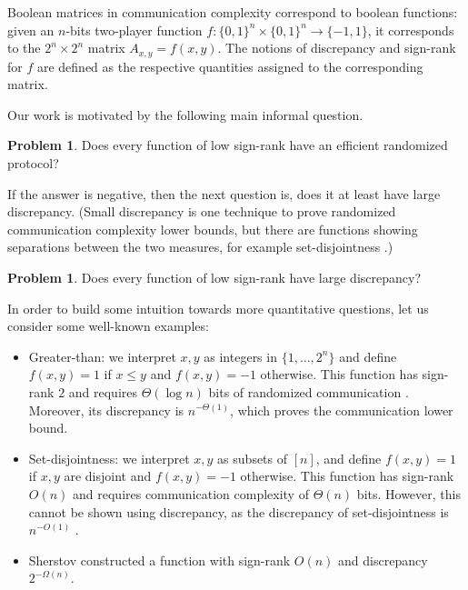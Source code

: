 \documentclass[11pt]{article}
\numberwithin{equation}{section}
\theoremstyle{definition}
\theoremstyle{plain}
\theoremstyle{definition}\newtheorem{problem}[theorem]{Problem}\theoremstyle{plain}
\begin{document}
Boolean matrices in communication complexity correspond to boolean functions:
given an $n$-bits %
two-player  %
function $f:\{0,1\}^n \times \{0,1\}^n \to \{-1,1\}$, it corresponds to the $2^n \times 2^n$ matrix $A_{x,y}=f(x,y)$. The notions of discrepancy and sign-rank
for $f$ %
%
are defined as the respective quantities assigned to the
corresponding matrix.

%
%
Our work is motivated by the following main informal question.  %
\begin{problem}
Does every function of low sign-rank have an efficient randomized protocol?
\end{problem}

If the answer is negative, then the next question is, does it at least have 
large %
discrepancy.  (Small   %
discrepancy is one technique to prove randomized communication complexity lower bounds, but there are functions showing separations between the two measures,
for example set-disjointness \cite{chattopadhyay2010story}.)  %


\begin{problem}
Does every function of low sign-rank have large discrepancy?
\end{problem}

In order to build some intuition towards more quantitative questions, 
let us consider some well-known examples:


\begin{itemize}
\item Greater-than: we interpret $x,y$ as integers in $\{1,\ldots,2^n\}$ and define $f(x,y) = 1$ if $x \le y$ and $f(x,y)=-1$ otherwise. This function has sign-rank $2$ and requires $\Theta(\log n)$ bits of randomized communication \cite{nisan1993communication}. Moreover, its discrepancy is $n^{-\Theta(1)}$, which proves the communication lower bound.

\item Set-disjointness: we interpret $x,y$ as subsets of $[n]$, and define $f(x,y)=1$ if $x,y$ are disjoint and $f(x,y)=-1$ otherwise. This function has sign-rank $O(n)$ and requires communication complexity of $\Theta(n)$ bits. However, this cannot be shown using discrepancy, as the discrepancy of set-disjointness is $n^{-O(1)}$ \cite{chattopadhyay2010story}.

\item Sherstov \cite{hardestSher} constructed a function with sign-rank $O(n)$ and discrepancy $2^{-\Omega(n)}$.
\end{itemize}
\end{document}
